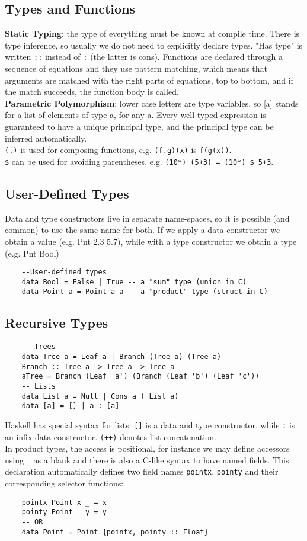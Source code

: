 \subsection{Types and Functions}
\textbf{Static Typing}: the type of everything must be known at compile time.
There is type inference, so usually we do not need to explicitly declare types.
"Has type" is written \texttt{::} instead of \texttt{:} (the latter is cons).
Functions are declared through a sequence of equations and they use pattern matching, which means that arguments are matched with the right parts of equations, top to bottom, and if the match succeeds, the function body is called.\\
\textbf{Parametric Polymorphism}: lower case letters are type variables, so [a] stands for a list of elements of type a, for any a.
Every well-typed expression is guaranteed to have a unique principal type, and the principal type can be inferred automatically.\\
\texttt{(.)} is used for composing functions, e.g. \texttt{(f.g)(x)} is \texttt{f(g(x))}.\\
\texttt{\$} can be used for avoiding parentheses, e.g. \texttt{(10*) (5+3) = (10*) \$ 5+3}.

\subsection{User-Defined Types}
Data and type constructors live in separate name-spaces, so it is possible (and common) to use the same name for both.
If we apply a data constructor we obtain a value (e.g. Pnt 2.3 5.7), while with a type constructor we obtain a type (e.g. Pnt Bool)
\begin{lstlisting}
	--User-defined types
	data Bool = False | True -- a "sum" type (union in C)
	data Point a = Point a a -- a "product" type (struct in C)
\end{lstlisting}

\subsection{Recursive Types}
\begin{lstlisting}
	-- Trees
	data Tree a = Leaf a | Branch (Tree a) (Tree a)
	Branch :: Tree a -> Tree a -> Tree a
	aTree = Branch (Leaf 'a') (Branch (Leaf 'b') (Leaf 'c'))
	-- Lists
	data List a = Null | Cons a ( List a)
	data [a] = [] | a : [a]
\end{lstlisting}
Haskell has special syntax for lists: \texttt{[]} is a data and type constructor, while \texttt{:} is an infix data constructor.
\texttt{(++)} denotes list concatenation.\\
In product types, the access is positional, for instance we may define accessors using \texttt{\_} as a blank and there is also a C-like syntax to have named fields.
This declaration automatically defines two field names \texttt{pointx}, \texttt{pointy} and their corresponding selector functions:
\begin{lstlisting}
	pointx Point x _ = x
	pointy Point _ y = y
	-- OR
	data Point = Point {pointx, pointy :: Float}
\end{lstlisting}

